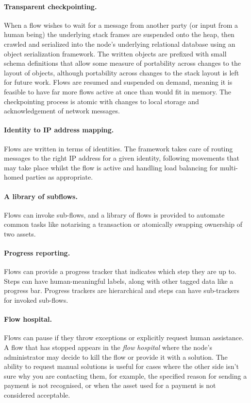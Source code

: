 \documentclass{article}
\begin{document}
\paragraph{Transparent checkpointing.}When a flow wishes to wait for a message from another party (or input from a
human being) the underlying stack frames are suspended onto the heap, then crawled and serialized into the node's
underlying relational database using an object serialization framework. The written objects are prefixed with small
schema definitions that allow some measure of portability across changes to the layout of objects, although
portability across changes to the stack layout is left for future work. Flows are resumed and suspended on demand, meaning
it is feasible to have far more flows active at once than would fit in memory. The checkpointing process is atomic with
changes to local storage and acknowledgement of network messages.

\paragraph{Identity to IP address mapping.}Flows are written in terms of identities. The framework takes care of routing
messages to the right IP address for a given identity, following movements that may take place whilst the flow is active
and handling load balancing for multi-homed parties as appropriate.

\paragraph{A library of subflows.}Flows can invoke sub-flows, and a library of flows is provided to automate common tasks
like notarising a transaction or atomically swapping ownership of two assets.

\paragraph{Progress reporting.}Flows can provide a progress tracker that indicates which step they are up to. Steps can
have human-meaningful labels, along with other tagged data like a progress bar. Progress trackers are hierarchical and
steps can have sub-trackers for invoked sub-flows.

\paragraph{Flow hospital.}Flows can pause if they throw exceptions or explicitly request human assistance. A flow that
has stopped appears in the \emph{flow hospital} where the node's administrator may decide to kill the flow or provide it
with a solution. The ability to request manual solutions is useful for cases where the other side isn't sure why you
are contacting them, for example, the specified reason for sending a payment is not recognised, or when the asset used for
a payment is not considered acceptable.
\end{document}
